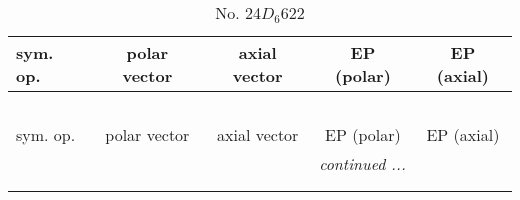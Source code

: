 \documentclass[fleqn,10pt,landscape]{jsarticle}
\begin{document}
\newpage
\begin{center}
\renewcommand{\arraystretch}{1.3}
\begin{longtable}{lcccc}
\caption{No. 24\quad$D_{6}$\quad$622$\quad[ hexagonal ]}
 \\
 \hline \hline
sym. op. & polar vector & axial vector & EP (polar) & EP (axial) \\ \hline \endfirsthead

\multicolumn{4}{l}{\tablename\ \thetable{}} \\
 \hline \hline
sym. op. & polar vector & axial vector & EP (polar) & EP (axial) \\ \hline \endhead

 \hline \hline
\multicolumn{4}{r}{\footnotesize\it continued ...} \\ \endfoot

 \hline \hline
\multicolumn{4}{r}{} \\ \endlastfoot


\end{longtable}
\end{center}
\end{document}
